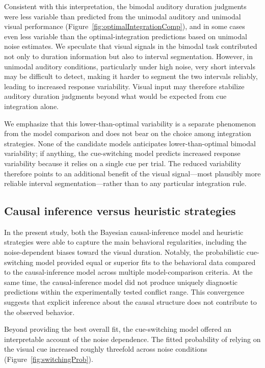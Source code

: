 \documentclass{jov}
\begin{document}
Consistent with this interpretation, the bimodal auditory duration judgments were less variable than predicted from the unimodal auditory and unimodal visual performance (Figure~\ref{fig:optimalIntegrationComp}), and in some cases even less variable than the optimal-integration predictions based on unimodal noise estimates. We speculate that visual signals in the bimodal task contributed not only to duration information but also to interval segmentation. However, in unimodal auditory conditions, particularly under high noise, very short intervals may be difficult to detect, making it harder to segment the two intervals reliably, leading to increased response variability. Visual input may therefore stabilize auditory duration judgments beyond what would be expected from cue integration alone.

We emphasize that this lower-than-optimal variability is a separate phenomenon from the model comparison and does not bear on the choice among integration strategies. None of the candidate models anticipates lower-than-optimal bimodal variability; if anything, the cue-switching model predicts increased response variability because it relies on a single cue per trial. The reduced variability therefore points to an additional benefit of the visual signal---most plausibly more reliable interval segmentation---rather than to any particular integration rule.

\subsection{Causal inference versus heuristic strategies}

In the present study, both the Bayesian causal-inference model and heuristic strategies were able to capture the main behavioral regularities, including the noise-dependent biases toward the visual duration. Notably, the probabilistic cue-switching model provided equal or superior fits to the behavioral data compared to the causal-inference model across multiple model-comparison criteria. At the same time, the causal-inference model did not produce uniquely diagnostic predictions within the experimentally tested conflict range. This convergence suggests that explicit inference about the causal structure does not contribute to the observed behavior. 

Beyond providing the best overall fit, the cue-switching model offered an interpretable account of the noise dependence. The fitted probability of relying on the visual cue increased roughly threefold across noise conditions (Figure~\ref{fig:switchingProb}).
\end{document}
